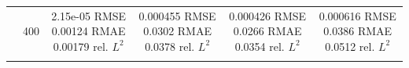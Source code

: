 \begin{tabular}{llcccc}
 & 400 & \shortstack{2.15e-05 RMSE\\0.00124 RMAE\\0.00179 rel. $L^2$} & \shortstack{0.000455 RMSE\\0.0302 RMAE\\0.0378 rel. $L^2$} & \shortstack{0.000426 RMSE\\0.0266 RMAE\\0.0354 rel. $L^2$} & \shortstack{0.000616 RMSE\\0.0386 RMAE\\0.0512 rel. $L^2$} \\
\addlinespace
\bottomrule
\end{tabular}
